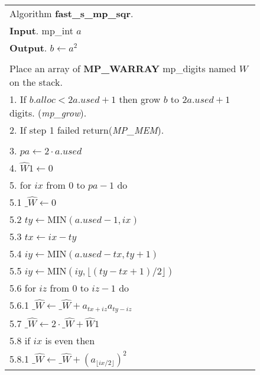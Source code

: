 \documentclass[b5paper]{book}
\begin{document}
\newpage\begin{figure}[!here]
\begin{small}
\begin{center}
\begin{tabular}{l}
\hline Algorithm \textbf{fast\_s\_mp\_sqr}. \\
\textbf{Input}.   mp\_int $a$ \\
\textbf{Output}.  $b \leftarrow a^2$ \\
\hline \\
Place an array of \textbf{MP\_WARRAY} mp\_digits named $W$ on the stack. \\
1.  If $b.alloc < 2a.used + 1$ then grow $b$ to $2a.used + 1$ digits.  (\textit{mp\_grow}). \\
2.  If step 1 failed return(\textit{MP\_MEM}). \\
\\
3.  $pa \leftarrow 2 \cdot a.used$ \\
4.  $\hat W1 \leftarrow 0$ \\
5.  for $ix$ from $0$ to $pa - 1$ do \\
\hspace{3mm}5.1  $\_ \hat W \leftarrow 0$ \\
\hspace{3mm}5.2  $ty \leftarrow \mbox{MIN}(a.used - 1, ix)$ \\
\hspace{3mm}5.3  $tx \leftarrow ix - ty$ \\
\hspace{3mm}5.4  $iy \leftarrow \mbox{MIN}(a.used - tx, ty + 1)$ \\
\hspace{3mm}5.5  $iy \leftarrow \mbox{MIN}(iy, \lfloor \left (ty - tx + 1 \right )/2 \rfloor)$ \\
\hspace{3mm}5.6  for $iz$ from $0$ to $iz - 1$ do \\
\hspace{6mm}5.6.1  $\_ \hat W \leftarrow \_ \hat W + a_{tx + iz}a_{ty - iz}$ \\
\hspace{3mm}5.7  $\_ \hat W \leftarrow 2 \cdot \_ \hat W  + \hat W1$ \\
\hspace{3mm}5.8  if $ix$ is even then \\
\hspace{6mm}5.8.1  $\_ \hat W \leftarrow \_ \hat W + \left ( a_{\lfloor ix/2 \rfloor}\right )^2$ \\

\end{tabular}
\end{center}
\end{small}
\end{figure}
\end{document}
